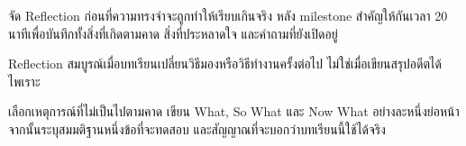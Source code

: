 
\begin{mentornote}
จัด Reflection ก่อนที่ความทรงจำจะถูกทำให้เรียบเกินจริง หลัง milestone สำคัญให้กันเวลา 20 นาทีเพื่อบันทึกทั้งสิ่งที่เกิดตามคาด สิ่งที่ประหลาดใจ และคำถามที่ยังเปิดอยู่
\end{mentornote}

\begin{keytakeaway}
Reflection สมบูรณ์เมื่อบทเรียนเปลี่ยนวิธีมองหรือวิธีทำงานครั้งต่อไป ไม่ใช่เมื่อเขียนสรุปอดีตได้ไพเราะ
\end{keytakeaway}

\begin{reflection}
เลือกเหตุการณ์ที่ไม่เป็นไปตามคาด เขียน What, So What และ Now What อย่างละหนึ่งย่อหน้า จากนั้นระบุสมมติฐานหนึ่งข้อที่จะทดสอบ และสัญญาณที่จะบอกว่าบทเรียนนี้ใช้ได้จริง
\blankline\blankline
\end{reflection}

